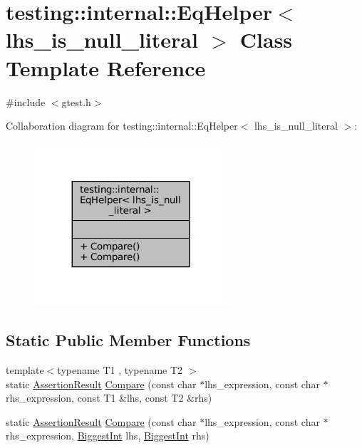 \hypertarget{classtesting_1_1internal_1_1EqHelper}{}\section{testing\+:\+:internal\+:\+:Eq\+Helper$<$ lhs\+\_\+is\+\_\+null\+\_\+literal $>$ Class Template Reference}
\label{classtesting_1_1internal_1_1EqHelper}


{\ttfamily \#include $<$gtest.\+h$>$}



Collaboration diagram for testing\+:\+:internal\+:\+:Eq\+Helper$<$ lhs\+\_\+is\+\_\+null\+\_\+literal $>$\+:
\nopagebreak
\begin{figure}[H]
\begin{center}
\leavevmode
\includegraphics[width=203pt]{classtesting_1_1internal_1_1EqHelper__coll__graph}
\end{center}
\end{figure}
\subsection*{Static Public Member Functions}
\begin{DoxyCompactItemize}
\item 
{\footnotesize template$<$typename T1 , typename T2 $>$ }\\static \hyperlink{classtesting_1_1AssertionResult}{Assertion\+Result} \hyperlink{classtesting_1_1internal_1_1EqHelper_ae3572c7374534a916b9117efaa89f33f}{Compare} (const char $\ast$lhs\+\_\+expression, const char $\ast$rhs\+\_\+expression, const T1 \&lhs, const T2 \&rhs)
\item 
static \hyperlink{classtesting_1_1AssertionResult}{Assertion\+Result} \hyperlink{classtesting_1_1internal_1_1EqHelper_aaa42c0059bb3dcc43d556243febb5f1c}{Compare} (const char $\ast$lhs\+\_\+expression, const char $\ast$rhs\+\_\+expression, \hyperlink{namespacetesting_1_1internal_a05c6bd9ede5ccdf25191a590d610dcc6}{Biggest\+Int} lhs, \hyperlink{namespacetesting_1_1internal_a05c6bd9ede5ccdf25191a590d610dcc6}{Biggest\+Int} rhs)
\end{DoxyCompactItemize}


